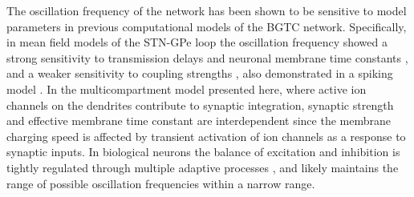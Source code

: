 %
The oscillation frequency of the network has been shown to be sensitive to model parameters in previous computational models of the BGTC network. Specifically, in mean field models of the STN-GPe loop the oscillation frequency showed a strong sensitivity to transmission delays and neuronal membrane time constants \cite{holgado_conditions_2010,lienard_beta-band_2017}, and a weaker sensitivity to coupling strengths \cite{holgado_conditions_2010,pavlides_computational_2015,liu_neural_2017}, also demonstrated in a spiking model \cite{wei_role_2015}. In the multicompartment model presented here, where active ion channels on the dendrites contribute to synaptic integration, synaptic strength and effective membrane time constant are interdependent since the membrane charging speed is affected by transient activation of ion channels as a response to synaptic inputs. In biological neurons the balance of excitation and inhibition is tightly regulated through multiple adaptive processes \cite{turrigiano_too_2011}, and likely maintains the range of possible oscillation frequencies within a narrow range.

%
%
%

